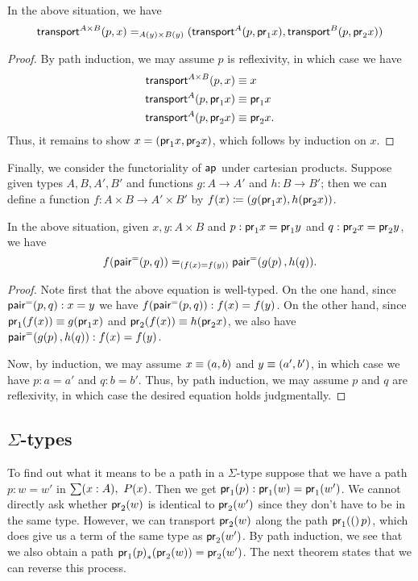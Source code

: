 \begin{thm}\label{thm:trans-prod}
  In the above situation, we have
  \[
  \id[A(y) \times B(y)]
  {\transfib{A\times B}px}
  {(\transfib{A}{p}{\proj{1}x}, \transfib{B}{p}{\proj{2}x})}
  \]
\end{thm}
\begin{proof}
  By path induction, we may assume $p$ is reflexivity, in which case we have
  \begin{align*}
    \transfib{A\times B}px&\jdeq x\\
    \transfib{A}{p}{\proj{1}x}&\jdeq \proj1x\\
    \transfib{A}{p}{\proj{2}x}&\jdeq \proj2x.
  \end{align*}
  Thus, it remains to show $x = (\proj1 x, \proj2x)$, which follows by induction on $x$.
\end{proof}

Finally, we consider the functoriality of $\apfunc{}$ under cartesian products.
Suppose given types $A,B,A',B'$ and functions $g:A\to A'$ and $h:B\to B'$; then we can define a function $f:A\times B\to A'\times B'$ by $f(x) \defeq (g(\proj1x),h(\proj2x))$.

\begin{thm}\label{thm:ap-prod}
  In the above situation, given $x,y:A\times B$ and $p:\proj1x=\proj1y$ and $q:\proj2x=\proj2y$, we have
  \[ \id[(f(x)=f(y))]{\ap{f}{\pairpath(p,q)}} {\pairpath(\ap{g}{p},\ap{h}{q})}. \]
\end{thm}
\begin{proof}
  Note first that the above equation is well-typed.
  On the one hand, since $\pairpath(p,q):x=y$ we have $\ap{f}{\pairpath(p,q)}:f(x)=f(y)$.
  On the other hand, since $\proj1(f(x))\jdeq g(\proj1x)$ and $\proj2(f(x))\jdeq h(\proj2x)$, we also have $\pairpath(\ap{g}{p},\ap{h}{q}):f(x)=f(y)$.

  Now, by induction, we may assume $x\jdeq(a,b)$ and $y\jdeq(a',b')$, in which case we have $p:a=a'$ and $q:b=b'$.
  Thus, by path induction, we may assume $p$ and $q$ are reflexivity, in which case the desired equation holds judgmentally.
\end{proof}


\subsection{$\Sigma$-types}
\label{sec:compute-sigma}

To find out what it means to be a path in a $\Sigma$-type suppose that we have a path $p:w=w'$ in $\sm{x:A}P(x)$. Then we get $\ap{\proj{1}}{p}:\proj{1}(w)=\proj{1}(w')$. We cannot directly ask whether $\proj{2}(w)$ is identical to $\proj{2}(w')$ since they don't have to be in the same type. However, we can transport $\proj{2}(w)$ along the path $\ap{\proj{1}}(p)$, which does give us a term of the same type as $\proj{2}(w')$. By path induction, we see that we also obtain a path $\trans{\ap{\proj{1}}{p}}{\proj{2}(w)}=\proj{2}(w')$. The next theorem states that we can reverse this process.

